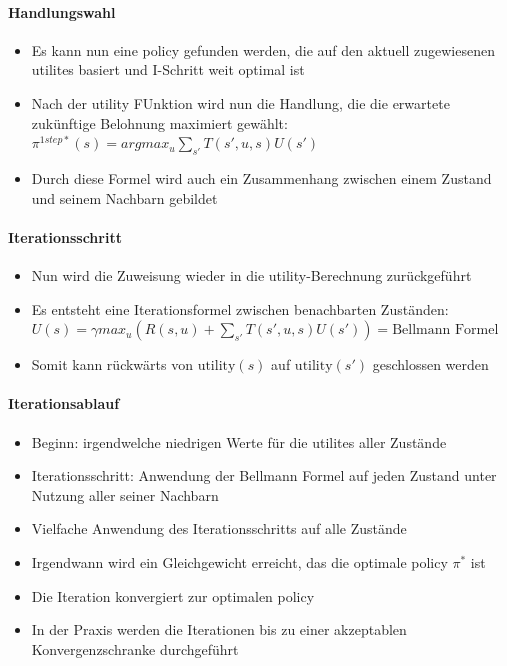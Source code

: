 \paragraph{Handlungswahl}
\begin{itemize}
	\item Es kann nun eine policy gefunden werden, die auf den aktuell zugewiesenen utilites basiert und I-Schritt weit optimal ist
	\item Nach der utility FUnktion wird nun die Handlung, die die erwartete zuk\"unftige Belohnung maximiert gew\"ahlt: $\pi^{1step*}(s) = argmax_u \sum_{s'} T(s', u, s) U(s')$
	\item Durch diese Formel wird auch ein Zusammenhang zwischen einem Zustand und seinem Nachbarn gebildet
\end{itemize}

\paragraph{Iterationsschritt}
\begin{itemize}
	\item Nun wird die Zuweisung wieder in die utility-Berechnung zur\"uckgef\"uhrt
	\item Es entsteht eine Iterationsformel zwischen benachbarten Zust\"anden:
	$U(s) = \gamma max_u (R(s,u) + \sum_{s'} T(s', u, s) U(s')) = \text{Bellmann Formel}$
	\item Somit kann r\"uckw\"arts von $\text{utility}(s)$ auf $\text{utility}(s')$ geschlossen werden
\end{itemize}

\paragraph{Iterationsablauf}
\begin{itemize}
	\item Beginn: irgendwelche niedrigen Werte f\"ur die utilites aller Zust\"ande
	\item Iterationsschritt: Anwendung der Bellmann Formel auf jeden Zustand unter Nutzung aller seiner Nachbarn
	\item Vielfache Anwendung des Iterationsschritts auf alle Zust\"ande
	\item Irgendwann wird ein Gleichgewicht erreicht, das die optimale policy $\pi^*$ ist
	\item Die Iteration konvergiert zur optimalen policy
	\item In der Praxis werden die Iterationen bis zu einer akzeptablen Konvergenzschranke durchgef\"uhrt
\end{itemize}

